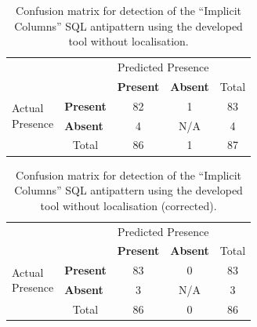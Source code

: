 \begin{table}[H]
    \centering
    \caption{Confusion matrix for detection of the “Implicit Columns” SQL antipattern using the developed tool without localisation.}
    \begin{tabular}{l|l|c|c|c}
        \multicolumn{2}{c}{}&\multicolumn{2}{c}{Predicted Presence}&\\
        \cline{3-4}
        \multicolumn{2}{c|}{}&\textbf{Present}&\textbf{Absent}&\multicolumn{1}{c}{Total}\\
        \cline{2-4}
        \multirow{2}{1.5cm}{Actual\\Presence}& \textbf{Present} & 82 & 1 & 83\\
        \cline{2-4}
        & \textbf{Absent} & 4 & N/A & 4\\
        \cline{2-4}
        \multicolumn{1}{c}{} & \multicolumn{1}{c}{Total} & \multicolumn{1}{c}{86} & \multicolumn{1}{c}{1} & \multicolumn{1}{c}{87}\\
    \end{tabular}
\end{table}

\begin{table}[H]
    \centering
    \caption{Confusion matrix for detection of the “Implicit Columns” SQL antipattern using the developed tool without localisation (corrected).}
    \begin{tabular}{l|l|c|c|c}
        \multicolumn{2}{c}{}&\multicolumn{2}{c}{Predicted Presence}&\\
        \cline{3-4}
        \multicolumn{2}{c|}{}&\textbf{Present}&\textbf{Absent}&\multicolumn{1}{c}{Total}\\
        \cline{2-4}
        \multirow{2}{1.5cm}{Actual\\Presence}& \textbf{Present} & 83 & 0 & 83\\
        \cline{2-4}
        & \textbf{Absent} & 3 & N/A & 3\\
        \cline{2-4}
        \multicolumn{1}{c}{} & \multicolumn{1}{c}{Total} & \multicolumn{1}{c}{86} & \multicolumn{1}{c}{0} & \multicolumn{1}{c}{86}\\
    \end{tabular}
\end{table}

